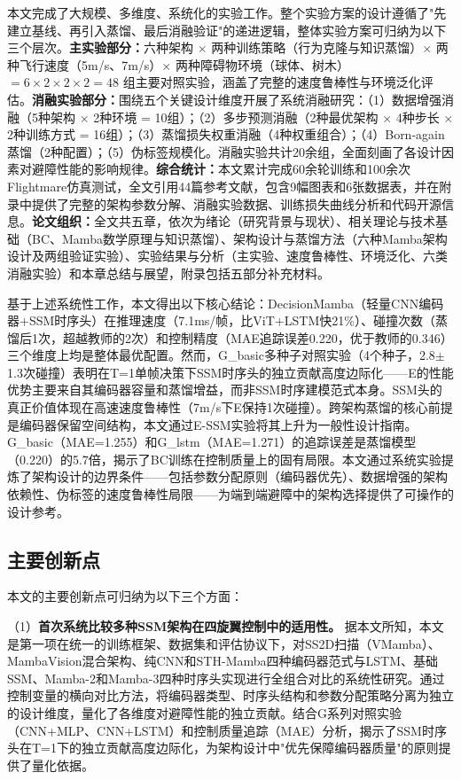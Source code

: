\documentclass[12pt,a4paper]{article}
\numberwithin{equation}{section}
\numberwithin{figure}{section}
\numberwithin{table}{section}
\begin{document}
本文完成了大规模、多维度、系统化的实验工作。整个实验方案的设计遵循了"先建立基线、再引入蒸馏、最后消融验证"的递进逻辑，整体实验方案可归纳为以下三个层次。\textbf{主实验部分：}六种架构 $\times$ 两种训练策略（行为克隆与知识蒸馏）$\times$ 两种飞行速度（5m/s、7m/s）$\times$ 两种障碍物环境（球体、树木）$= 6 \times 2 \times 2 \times 2 = 48$ 组主要对照实验，涵盖了完整的速度鲁棒性与环境泛化评估。\textbf{消融实验部分：}围绕五个关键设计维度开展了系统消融研究：（1）数据增强消融（5种架构 $\times$ 2种环境 = 10组）；（2）多步预测消融（2种最优架构 $\times$ 4种步长 $\times$ 2种训练方式 = 16组）；（3）蒸馏损失权重消融（4种权重组合）；（4）Born-again蒸馏（2种配置）；（5）伪标签规模化。消融实验共计20余组，全面刻画了各设计因素对避障性能的影响规律。\textbf{综合统计：}本文累计完成60余轮训练和100余次Flightmare仿真测试，全文引用44篇参考文献，包含9幅图表和6张数据表，并在附录中提供了完整的架构参数分解、消融实验数据、训练损失曲线分析和代码开源信息。\textbf{论文组织：}全文共五章，依次为绪论（研究背景与现状）、相关理论与技术基础（BC、Mamba数学原理与知识蒸馏）、架构设计与蒸馏方法（六种Mamba架构设计及两组验证实验）、实验结果与分析（主实验、速度鲁棒性、环境泛化、六类消融实验）和本章总结与展望，附录包括五部分补充材料。

基于上述系统性工作，本文得出以下核心结论：DecisionMamba（轻量CNN编码器+SSM时序头）在推理速度（7.1ms/帧，比ViT+LSTM快21\%）、碰撞次数（蒸馏后1次，超越教师的2次）和控制精度（MAE追踪误差0.220，优于教师的0.346）三个维度上均是整体最优配置。然而，G\_basic多种子对照实验（4个种子，2.8$\pm$1.3次碰撞）表明在T=1单帧决策下SSM时序头的独立贡献高度边际化——E的性能优势主要来自其编码器容量和蒸馏增益，而非SSM时序建模范式本身。SSM头的真正价值体现在高速速度鲁棒性（7m/s下E保持1次碰撞）。跨架构蒸馏的核心前提是编码器保留空间结构，本文通过E-SSM实验将其上升为一般性设计指南。G\_basic（MAE=1.255）和G\_lstm（MAE=1.271）的追踪误差是蒸馏模型（0.220）的5.7倍，揭示了BC训练在控制质量上的固有局限。本文通过系统实验提炼了架构设计的边界条件——包括参数分配原则（编码器优先）、数据增强的架构依赖性、伪标签的速度鲁棒性局限——为端到端避障中的架构选择提供了可操作的设计参考。

\subsection{主要创新点}

本文的主要创新点可归纳为以下三个方面：

（1）\textbf{首次系统比较多种SSM架构在四旋翼控制中的适用性。} 据本文所知，本文是第一项在统一的训练框架、数据集和评估协议下，对SS2D扫描（VMamba）、MambaVision混合架构、纯CNN和STH-Mamba四种编码器范式与LSTM、基础SSM、Mamba-2和Mamba-3四种时序头实现进行全组合对比的系统性研究。通过控制变量的横向对比方法，将编码器类型、时序头结构和参数分配策略分离为独立的设计维度，量化了各维度对避障性能的独立贡献。结合G系列对照实验（CNN+MLP、CNN+LSTM）和控制质量追踪（MAE）分析，揭示了SSM时序头在T=1下的独立贡献高度边际化，为架构设计中"优先保障编码器质量"的原则提供了量化依据。
\end{document}

